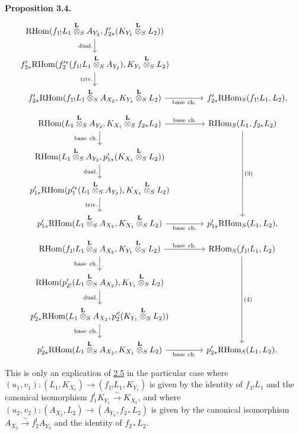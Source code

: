 \documentclass[11pt]{article}
\newenvironment{statement}[1]{\par\medskip\noindent\textbf{#1.}\ }{\par\medskip}
\providecommand{\RHom}{\mathrm{RHom}}
\providecommand{\RHom}{\mathrm{RHom}}
\providecommand{\RHom}{\mathrm R\mathcal{H}om}
\providecommand{\RHom}{\mathrm{RHom}}
\begin{document}
\begin{statement}{Proposition 3.4}
\[\begin{tikzcd}[column sep=3.7em,row sep=1.7em]
\RHom(f_{1!}L_1\overset{\mathbf L}{\otimes}_S A_{Y_2},f'_{2*}(K_{Y_1}\overset{\mathbf L}{\otimes}_S L_2)) \arrow[d,"\mathrm{dual.}"']
& \\
f'_{2*}\RHom(f_2'^*(f_{1!}L_1\overset{\mathbf L}{\otimes}_S A_{Y_2}),K_{Y_1}\overset{\mathbf L}{\otimes}_S L_2) \arrow[d,"\mathrm{triv.}"']
& \\
f'_{2*}\RHom(f_{1!}L_1\overset{\mathbf L}{\otimes}_S A_{X_2},K_{Y_1}\overset{\mathbf L}{\otimes}_S L_2) \arrow[r,"\mathrm{base\ ch.}"']
& f'_{2*}\RHom_S(f_{1!}L_1,L_2),
\end{tikzcd}
\]
\[
\begin{tikzcd}[column sep=3.7em,row sep=1.7em]
\RHom(L_1\overset{\mathbf L}{\otimes}_S A_{Y_2},K_{X_1}\overset{\mathbf L}{\otimes}_S f_{2*}L_2)
  \arrow[r,"\mathrm{base\ ch.}"] \arrow[d,"\mathrm{base\ ch.}"']
& \RHom_S(L_1,f_{2*}L_2) \arrow[ddd,"(3)"] \\
\RHom(L_1\overset{\mathbf L}{\otimes}_S A_{Y_2},p'_{1*}(K_{X_1}\overset{\mathbf L}{\otimes}_S L_2)) \arrow[d,"\mathrm{dual.}"']
& \\
p'_{1*}\RHom(p_1'^*(L_1\overset{\mathbf L}{\otimes}_S A_{Y_2}),K_{X_1}\overset{\mathbf L}{\otimes}_S L_2) \arrow[d,"\mathrm{triv.}"']
& \\
p'_{1*}\RHom(L_1\overset{\mathbf L}{\otimes}_S A_{X_2},K_{X_1}\overset{\mathbf L}{\otimes}_S L_2) \arrow[r,"\mathrm{base\ ch.}"']
& p'_{1*}\RHom_S(L_1,L_2),
\end{tikzcd}
\]
\[
\begin{tikzcd}[column sep=3.7em,row sep=1.7em]
\RHom(f_{1!}L_1\overset{\mathbf L}{\otimes}_S A_{X_2},K_{Y_1}\overset{\mathbf L}{\otimes}_S L_2)
  \arrow[r,"\mathrm{base\ ch.}"] \arrow[d,"\mathrm{base\ ch.}"']
& \RHom_S(f_{1!}L_1,L_2) \arrow[ddd,"(4)"] \\
\RHom(p'_{2!}(L_1\overset{\mathbf L}{\otimes}_S A_{X_2}),K_{Y_1}\overset{\mathbf L}{\otimes}_S L_2) \arrow[d,"\mathrm{dual.}"']
& \\
p'_{2*}\RHom(L_1\overset{\mathbf L}{\otimes}_S A_{X_2},p_2'^!(K_{Y_1}\overset{\mathbf L}{\otimes}_S L_2)) \arrow[d,"\mathrm{base\ ch.}"']
& \\
p'_{2*}\RHom(L_1\overset{\mathbf L}{\otimes}_S A_{X_2},K_{X_1}\overset{\mathbf L}{\otimes}_S L_2) \arrow[r,"\mathrm{base\ ch.}"']
& p'_{2*}\RHom_S(L_1,L_2).
\end{tikzcd}
\]
\end{statement}
This is only an explication of \hyperref[sga5:III:proposition:2.5]{2.5} in the particular case where $(u_1,v_1):(L_1,K_{X_1})\to(f_{1!}L_1,K_{Y_1})$ is given by the identity of $f_{1!}L_1$ and the canonical isomorphism $f_1^!K_{Y_1}\xrightarrow{\sim}K_{X_1}$, and where $(u_2,v_2):(A_{X_2},L_2)\to(A_{Y_2},f_{2*}L_2)$ is given by the canonical isomorphism $A_{X_2}\xrightarrow{\sim}f_2^!A_{Y_2}$ and the identity of $f_{2*}L_2$.
\end{document}
